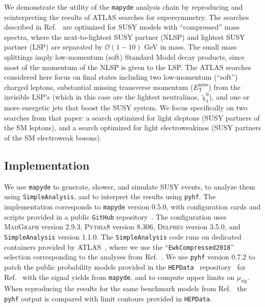 \documentclass{article}
\newcommand{\chioz}{\ensuremath{\widetilde{\chi}_{1}^{0}}}
\newcommand{\met}{\ensuremath{E_{\mathrm{T}}^{\mathrm{miss}}}}
\newcommand{\mapyde}{\texttt{mapyde}}
\newcommand{\simpleanalysis}{\texttt{SimpleAnalysis}}
\newcommand{\madgraph}{\textsc{MadGraph}}
\newcommand{\pythia}{\textsc{Pythia8}}
\newcommand{\delphes}{\textsc{Delphes}}
\newcommand{\pyhf}{\texttt{pyhf}}
\newcommand{\musig}{\ensuremath{\mu_{\mathrm{sig}}}}
\newcommand{\hepdata}{\texttt{HEPData}}
\begin{document}
We demonstrate the utility of the \mapyde{} analysis chain by reproducing and reinterpreting the results of ATLAS searches for supersymmetry.  The searches described in Ref.~\cite{ATLAS:2019lng} are optimized for SUSY models with \enquote{compressed} mass spectra, where the next-to-lightest SUSY partner (NLSP) and lightest SUSY partner (LSP) are separated by $\mathcal{O}(1-10)$ GeV in mass.  The small mass splittings imply low-momentum (soft) Standard Model decay products, since most of the momentum of the NLSP is given to the LSP.  The ATLAS searches considered here focus on final states including two low-momentum (\enquote{soft}) charged leptons, substantial missing transverse momentum (\met) from the invisible LSP's (which in this case are the lightest neutralinos, \chioz), and one or more energetic jets that boost the SUSY system.  We focus specifically on two searches from that paper: a search optimized for light sleptons (SUSY partners of the SM leptons), and a search optimized for light electroweakinos (SUSY partners of the SM electroweak bosons).

\subsection{Implementation}
\label{ssec:implementation}

We use \mapyde{} to generate, shower, and simulate SUSY events, to analyze them using \simpleanalysis, and to interpret the results using \pyhf.  The implementation corresponds to \mapyde{} version 0.5.0, with configuration cards and scripts provided in a public \texttt{GitHub} repository~\cite{mapyde-user}.  The configuration uses \madgraph{} version 2.9.3, \pythia{} version 8.306, \delphes{} version 3.5.0, and \simpleanalysis{} version 1.1.0.  The \simpleanalysis{} code runs on dedicated containers provided by ATLAS~\cite{SAGitLabRegistry}, where we use the \enquote{\texttt{EwkCompressed2018}} selection corresponding to the analyses from Ref.~\cite{ATLAS:2019lng}.  We use \pyhf{} version 0.7.2 to patch the public probability models provided in the \hepdata~\cite{HepData} repository~\cite{hepdata.91374} for Ref.~\cite{ATLAS:2019lng} with the signal yields from \mapyde, and to compute upper limits on \musig.  When reproducing the results for the same benchmark models from Ref.~\cite{ATLAS:2019lng} the \pyhf{} output is compared with limit contours provided in \hepdata.
\end{document}
